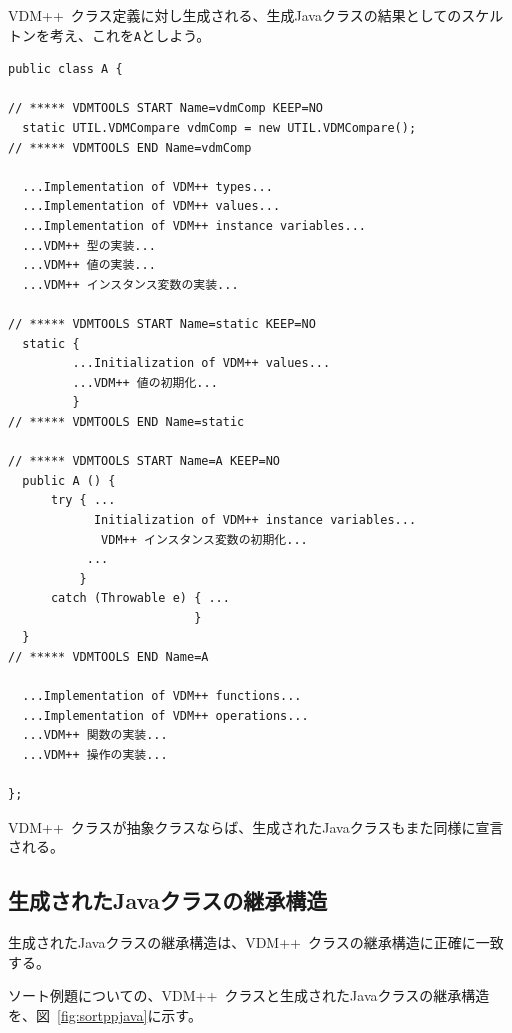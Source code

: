 \documentclass[\pformat,11pt]{jarticle}
\newcommand{\VDM}{VDM++}
\begin{document}
\VDM\ クラス定義に対し生成される、生成Javaクラスの結果としてのスケルトンを考え、これを{\tt A}としよう。

\begin{screen}
\begin{verbatim}
public class A {

// ***** VDMTOOLS START Name=vdmComp KEEP=NO
  static UTIL.VDMCompare vdmComp = new UTIL.VDMCompare();
// ***** VDMTOOLS END Name=vdmComp

  ...Implementation of VDM++ types...
  ...Implementation of VDM++ values... 
  ...Implementation of VDM++ instance variables... 
  ...VDM++ 型の実装...
  ...VDM++ 値の実装... 
  ...VDM++ インスタンス変数の実装... 

// ***** VDMTOOLS START Name=static KEEP=NO
  static {
         ...Initialization of VDM++ values...
         ...VDM++ 値の初期化...
         }
// ***** VDMTOOLS END Name=static

// ***** VDMTOOLS START Name=A KEEP=NO
  public A () { 
      try { ...
            Initialization of VDM++ instance variables...
             VDM++ インスタンス変数の初期化...
           ...
          }
      catch (Throwable e) { ...
                          }
  }
// ***** VDMTOOLS END Name=A

  ...Implementation of VDM++ functions... 
  ...Implementation of VDM++ operations... 
  ...VDM++ 関数の実装... 
  ...VDM++ 操作の実装... 

};
\end{verbatim}
\end{screen}

\VDM\ クラスが抽象クラスならば、生成されたJavaクラスもまた同様に宣言される。

\subsection{生成されたJavaクラスの継承構造}
\label{inheritance}
生成されたJavaクラスの継承構造は、\VDM\ クラスの継承構造に正確に一致する。

ソート例題についての、\VDM\ クラスと生成されたJavaクラスの継承構造を、図~\ref{fig:sortppjava}に示す。
\end{document}
